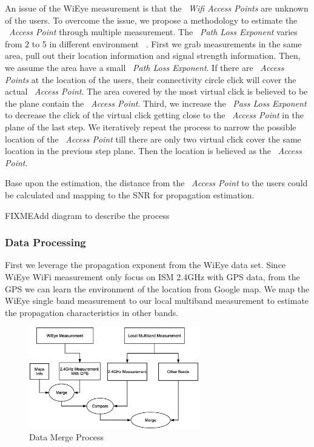 An issue of the WiEye measurement is that the ~\emph{Wifi Access Points} are unknown of the users. To overcome the issue, we propose a methodology to estimate the ~\emph{Access Point} through multiple measurement.
The ~\emph{Path Loss Exponent} varies from 2 to 5 in different environment ~\cite{camp2006measurement}. 
First we grab measurements in the same area, pull out their location information and signal strength information.
Then, we assume the area have a small ~\emph{Path Loss Exponent}. If there are ~\emph{Access Points} at the location of the users, their connectivity circle click will cover the actual ~\emph{Access Point}. The area covered by the most virtual click is believed to be the plane contain the ~\emph{Access Point}.
Third, we increase the ~\emph{Pass Loss Exponent} to decrease the click of the virtual click getting close to the ~\emph{Access Point} in the plane of the last step. We iteratively repeat the process to narrow the possible location of the ~\emph{Access Point} till there are only two virtual click cover the same location in the previous step plane. 
Then the location is believed as the ~\emph{Access Point}.

Base upon the estimation, the distance from the ~\emph{Access Point} to the users could be calculated and mapping to the SNR for propagation estimation.

FIXME{Add diagram to describe the process}

\subsubsection{Data Processing}
First we leverage the propagation exponent from the WiEye data set. Since WiEye WiFi measurement only focus on ISM 2.4GHz with GPS data, from the GPS we can learn the environment of the location from Google map. We map the WiEye single band measurement to our local multiband measurement to estimate the propagation characteristics in other bands.


\begin{figure}
\centering
\includegraphics[width=74mm]{figures/wieye_process}
\vspace{-0.1in}
\caption{Data Merge Process}
\label{fig:wieye_process}
\end{figure}

